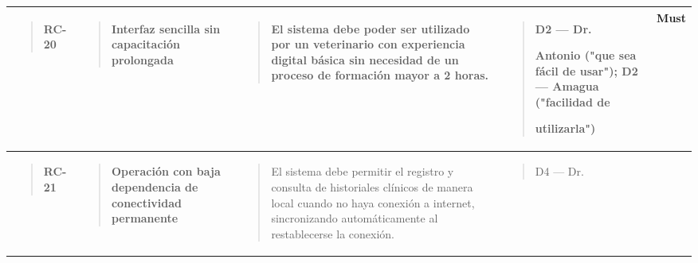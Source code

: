 \documentclass[
]{article}
\newcounter{none} %
\begin{document}
{\def\LTcaptype{none} %
\begin{longtable}[]{@{}
  >{\raggedright\arraybackslash}p{}
  >{\raggedright\arraybackslash}p{}
  >{\raggedright\arraybackslash}p{}
  >{\raggedright\arraybackslash}p{}
  >{\centering\arraybackslash}p{}@{}}
\toprule\noalign{}
\begin{minipage}[b]{\linewidth}\raggedright
\begin{quote}
\textbf{RC-20}
\end{quote}
\end{minipage} & \begin{minipage}[b]{\linewidth}\raggedright
\begin{quote}
\textbf{Interfaz sencilla sin capacitación prolongada}
\end{quote}
\end{minipage} & \begin{minipage}[b]{\linewidth}\raggedright
\begin{quote}
El sistema debe poder ser utilizado por un veterinario con experiencia
digital básica sin necesidad de un proceso de formación mayor a 2 horas.
\end{quote}
\end{minipage} & \begin{minipage}[b]{\linewidth}\raggedright
\begin{quote}
D2 --- Dr.

Antonio ("que sea fácil de usar"); D2 --- Amagua ("facilidad de

utilizarla")
\end{quote}
\end{minipage} & \begin{minipage}[b]{\linewidth}\centering
\textbf{Must}
\end{minipage} \\
\midrule\noalign{}
\endhead
\bottomrule\noalign{}
\endlastfoot
\begin{minipage}[t]{\linewidth}\raggedright
\begin{quote}
\textbf{RC-21}
\end{quote}
\end{minipage} & \begin{minipage}[t]{\linewidth}\raggedright
\begin{quote}
\textbf{Operación con baja dependencia de conectividad permanente}
\end{quote}
\end{minipage} & \begin{minipage}[t]{\linewidth}\raggedright
\begin{quote}
El sistema debe permitir el registro y consulta de historiales clínicos
de manera local cuando no haya conexión a internet, sincronizando
automáticamente al restablecerse la conexión.
\end{quote}
\end{minipage} & \begin{minipage}[t]{\linewidth}\raggedright
\begin{quote}
D4 --- Dr.


\end{quote}
\end{minipage}
\end{longtable}}
\end{document}
